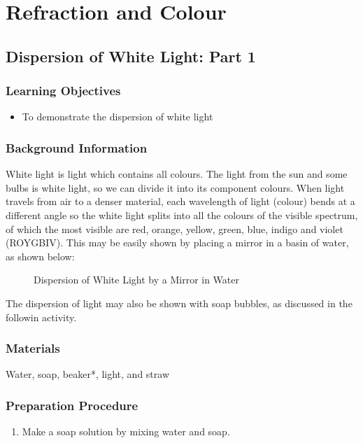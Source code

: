 \section{Refraction and Colour}

\subsection{Dispersion of White Light: Part 1}

\subsubsection*{Learning Objectives}
\begin{itemize}
\item{To demonstrate the dispersion of white light} 
\end{itemize}

\subsubsection*{Background Information}
White light is light which contains all colours.  The light from the sun and some bulbs is white light, so we can divide it into its component colours.  When light travels from air to a denser material, each wavelength of light (colour) bends at a different angle so the white light splits into all the colours of the visible spectrum, of which the most visible are red, orange, yellow, green, blue, indigo and violet (ROYGBIV). This may be easily shown by placing a mirror in a basin of water, as shown below:

\begin{figure}
\begin{center}
\def\svgwidth{150pt}

\caption{Dispersion of White Light by a Mirror in Water}
\label{fig:dispersion-white-light}
\end{center}
\end{figure}

The dispersion of light may also be shown with soap bubbles, as discussed in the followin activity.

\subsubsection*{Materials}
Water, soap, beaker*, light, and straw

\subsubsection*{Preparation Procedure}
\begin{enumerate}
\item{Make a soap solution by mixing water and soap.} 
\end{enumerate}

